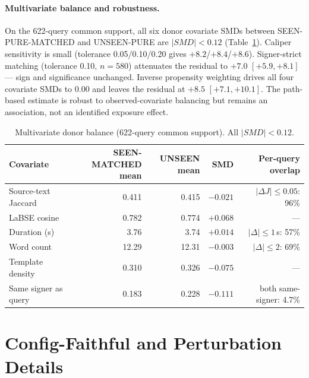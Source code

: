 \documentclass[pdflatex,sn-chicago]{sn-jnl}
\begin{document}
\paragraph{Multivariate balance and robustness.}
On the 622-query common support, all six donor covariate SMDs between SEEN-PURE-MATCHED and UNSEEN-PURE are $|SMD|<0.12$ (Table~\ref{tab:multivariate_balance}). Caliper sensitivity is small (tolerance 0.05/0.10/0.20 gives $+8.2$/$+8.4$/$+8.6$). Signer-strict matching (tolerance 0.10, $n{=}580$) attenuates the residual to $+7.0$ $[+5.9,+8.1]$ --- sign and significance unchanged. Inverse propensity weighting drives all four covariate SMDs to 0.00 and leaves the residual at $+8.5$ $[+7.1,+10.1]$. The path-based estimate is robust to observed-covariate balancing but remains an association, not an identified exposure effect.

\begin{table}[h]
\centering
\scriptsize\setlength{\tabcolsep}{3pt}
\caption{Multivariate donor balance (622-query common support). All $|SMD|<0.12$.}
\label{tab:multivariate_balance}
\begin{tabular}{lrrrr}
\toprule
Covariate & SEEN-MATCHED mean & UNSEEN mean & SMD & Per-query overlap \\
\midrule
Source-text Jaccard & 0.411 & 0.415 & $-0.021$ & $|{\Delta}J|{\leq}0.05$: 96\% \\
LaBSE cosine & 0.782 & 0.774 & $+0.068$ & --- \\
Duration (s) & 3.76 & 3.74 & $+0.014$ & $|{\Delta}|\leq1$\,s: 57\% \\
Word count & 12.29 & 12.31 & $-0.003$ & $|{\Delta}|\leq2$: 69\% \\
Template density & 0.310 & 0.326 & $-0.075$ & --- \\
Same signer as query & 0.183 & 0.228 & $-0.111$ & both same-signer: 4.7\% \\
\bottomrule
\end{tabular}
\end{table}

\section{Config-Faithful and Perturbation Details}
\label{sec:appendix_config_faithful}
\end{document}
